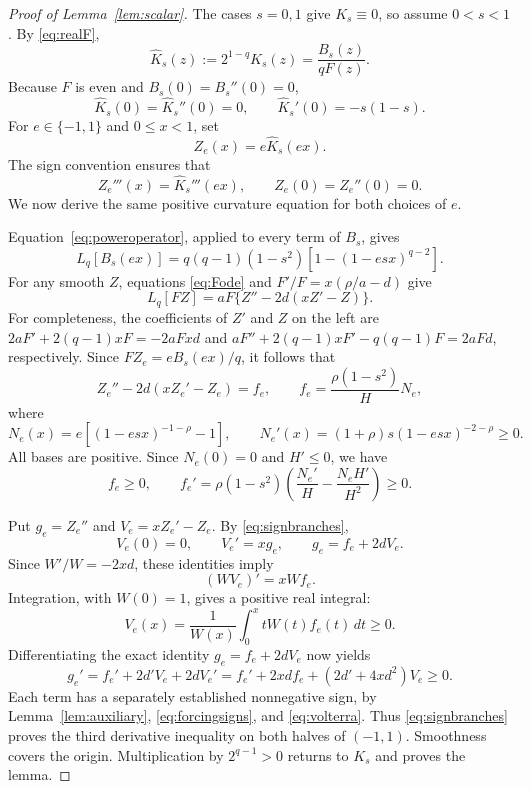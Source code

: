 \documentclass[11pt,a4paper]{amsart}
\numberwithin{equation}{section}
\theoremstyle{remark}
\begin{document}
\begin{proof}[Proof of Lemma~\ref{lem:scalar}]
The cases $s=0,1$ give $K_s\equiv0$, so assume $0<s<1$.
By \eqref{eq:realF},
\[
 \widehat K_s(z):=2^{1-q}K_s(z)=\frac{B_s(z)}{qF(z)}.
\]
Because $F$ is even and $B_s(0)=B_s''(0)=0$,
\[
 \widehat K_s(0)=\widehat K_s''(0)=0,
 \qquad \widehat K_s'(0)=-s(1-s).
\]
For $e\in\{-1,1\}$ and $0\le x<1$, set
\[
 Z_e(x)=e\widehat K_s(ex).
\]
The sign convention ensures that
\begin{equation}
 Z_e'''(x)=\widehat K_s'''(ex),\qquad
 Z_e(0)=Z_e''(0)=0.
 \label{eq:signbranches}
\end{equation}
We now derive the same positive curvature equation for both choices
of $e$.

Equation~\eqref{eq:poweroperator}, applied to every term of $B_s$, gives
\begin{equation}
 L_q[B_s(ex)]=q(q-1)(1-s^2)
                [1-(1-esx)^{q-2}].
 \label{eq:Boperator}
\end{equation}
For any smooth $Z$, equations \eqref{eq:Fode} and
$F'/F=x(\rho/a-d)$ give
\begin{equation}
 L_q[FZ]=aF\{Z''-2d(xZ'-Z)\}.
 \label{eq:productoperator}
\end{equation}
For completeness, the coefficients of $Z'$ and $Z$ on the left are
$2aF'+2(q-1)xF=-2aFxd$ and
$aF''+2(q-1)xF'-q(q-1)F=2aFd$, respectively.
Since $FZ_e=eB_s(ex)/q$, it follows that
\begin{equation}
 Z_e''-2d(xZ_e'-Z_e)=f_e,
 \qquad f_e=\frac{\rho(1-s^2)}H N_e,
 \label{eq:curvatureode}
\end{equation}
where
\[
 N_e(x)=e[(1-esx)^{-1-\rho}-1],\qquad
 N_e'(x)=(1+\rho)s(1-esx)^{-2-\rho}\ge0.
\]
All bases are positive. Since $N_e(0)=0$ and $H'\le0$, we have
\begin{equation}
 f_e\ge0,\qquad
 f_e'=\rho(1-s^2)\left(\frac{N_e'}H-\frac{N_eH'}{H^2}\right)\ge0.
 \label{eq:forcingsigns}
\end{equation}

Put $g_e=Z_e''$ and $V_e=xZ_e'-Z_e$. By \eqref{eq:signbranches},
\[
 V_e(0)=0,\qquad V_e'=xg_e,\qquad g_e=f_e+2dV_e.
\]
Since $W'/W=-2xd$, these identities imply
\[
 (WV_e)'=xWf_e.
\]
Integration, with $W(0)=1$, gives a positive real integral:
\begin{equation}
 V_e(x)=\frac1{W(x)}\int_0^x tW(t)f_e(t)\,dt\ge0.
 \label{eq:volterra}
\end{equation}
Differentiating the exact identity $g_e=f_e+2dV_e$ now yields
\begin{equation}
 g_e'=f_e'+2d'V_e+2dV_e'
      =f_e'+2xd f_e+(2d'+4xd^2)V_e\ge0.
 \label{eq:thirdpositive}
\end{equation}
Each term has a separately established nonnegative sign, by
Lemma~\ref{lem:auxiliary}, \eqref{eq:forcingsigns}, and
\eqref{eq:volterra}. Thus \eqref{eq:signbranches} proves the third
derivative inequality on both halves of $(-1,1)$. Smoothness covers
the origin. Multiplication by $2^{q-1}>0$ returns to $K_s$ and proves
the lemma.
\end{proof}
\end{document}
